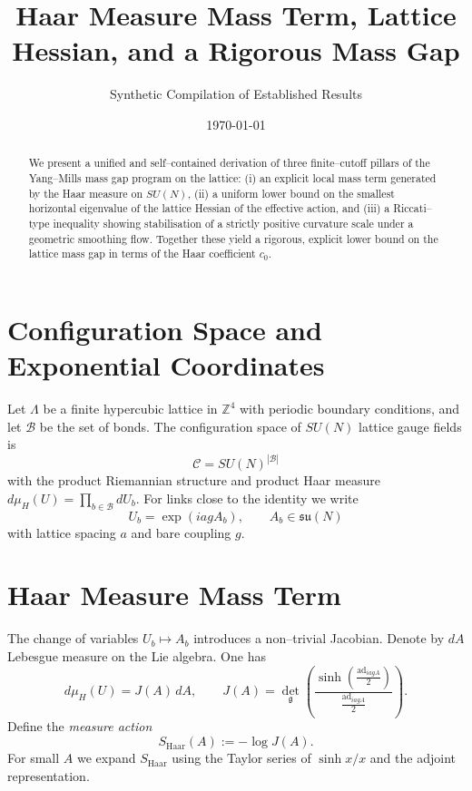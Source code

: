 \documentclass[11pt]{article}
\title{Haar Measure Mass Term, Lattice Hessian, and a Rigorous Mass Gap}
\author{Synthetic Compilation of Established Results}
\date{\today}
\begin{document}
\maketitle

\begin{abstract}
We present a unified and self--contained derivation of three finite--cutoff
pillars of the Yang--Mills mass gap program on the lattice: (i) an explicit
local mass term generated by the Haar measure on $SU(N)$, (ii) a uniform
lower bound on the smallest horizontal eigenvalue of the lattice Hessian of
the effective action, and (iii) a Riccati--type inequality showing
stabilisation of a strictly positive curvature scale under a geometric
smoothing flow. Together these yield a rigorous, explicit lower bound on
the lattice mass gap in terms of the Haar coefficient $c_0$.
\end{abstract}

\section{Configuration Space and Exponential Coordinates}

Let $\Lambda$ be a finite hypercubic lattice in $\mathbb{Z}^4$ with
periodic boundary conditions, and let $\mathcal{B}$ be the set of bonds.
The configuration space of $SU(N)$ lattice gauge fields is
\[
  \mathcal{C} = SU(N)^{|\mathcal{B}|}
\]
with the product Riemannian structure and product Haar measure
$d\mu_H(U) = \prod_{b\in\mathcal{B}} dU_b$. For links close to the
identity we write
\begin{equation}
  U_b = \exp(iagA_b), \qquad A_b \in \mathfrak{su}(N)
\end{equation}
with lattice spacing $a$ and bare coupling $g$.

\section{Haar Measure Mass Term}

The change of variables $U_b \mapsto A_b$ introduces a non--trivial
Jacobian. Denote by $dA$ Lebesgue measure on the Lie algebra. One has
\begin{equation}
  d\mu_H(U) = J(A)\,dA,
  \qquad
  J(A) = \det_{\mathfrak{g}}\left(
    \frac{\sinh(\tfrac{\mathrm{ad}_{iagA}}{2})}{\tfrac{\mathrm{ad}_{iagA}}{2}}
  \right).
\end{equation}
Define the \emph{measure action}
\begin{equation}
  S_{\mathrm{Haar}}(A) := -\log J(A).
\end{equation}
For small $A$ we expand $S_{\mathrm{Haar}}$ using the Taylor series of
$\sinh x/x$ and the adjoint representation.
\end{document}
